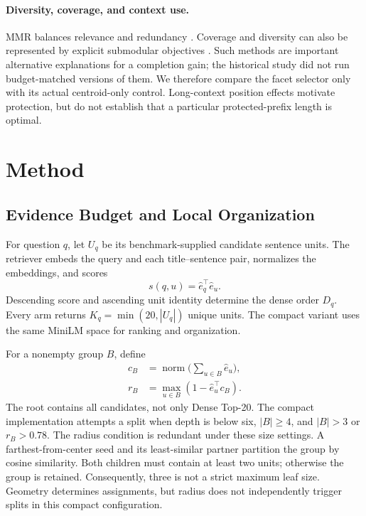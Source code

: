 \documentclass[11pt]{article}
\begin{document}
\paragraph{Diversity, coverage, and context use.}
MMR balances relevance and redundancy \citep{carbonell1998mmr}.
Coverage and diversity can also be represented by explicit submodular
objectives \citep{lin2011submodular}. Such methods are important alternative
explanations for a completion gain; the historical study did not run
budget-matched versions of them. We therefore compare the facet selector only
with its actual centroid-only control. Long-context position effects
\citep{liu2024lostmiddle} motivate protection, but do not establish that a
particular protected-prefix length is optimal.

\section{Method}
\subsection{Evidence Budget and Local Organization}
For question $q$, let $U_q$ be its benchmark-supplied candidate sentence
units. The retriever embeds the query and each title--sentence pair, normalizes
the embeddings, and scores
\begin{equation}
s(q,u)=\hat e_q^\top\hat e_u.
\end{equation}
Descending score and ascending unit identity determine the dense order $D_q$.
Every arm returns $K_q=\min(20,|U_q|)$ unique units.
The compact variant uses the same MiniLM space for ranking and organization.

For a nonempty group $B$, define
\begin{equation}
\begin{aligned}
c_B&=\operatorname{norm}\Big(\sum_{u\in B}\hat e_u\Big),\\
r_B&=\max_{u\in B}(1-\hat e_u^\top c_B).
\end{aligned}
\end{equation}
The root contains all candidates, not only Dense Top-20. The compact
implementation attempts a split when depth is below six, $|B|\geq4$, and
$|B|>3$ or $r_B>0.78$. The radius condition is redundant under these size
settings. A farthest-from-center seed and its least-similar partner partition
the group by cosine similarity. Both children must contain at least two units;
otherwise the group is retained. Consequently, three is not a strict maximum
leaf size. Geometry determines assignments, but radius does not independently
trigger splits in this compact configuration.
\end{document}

